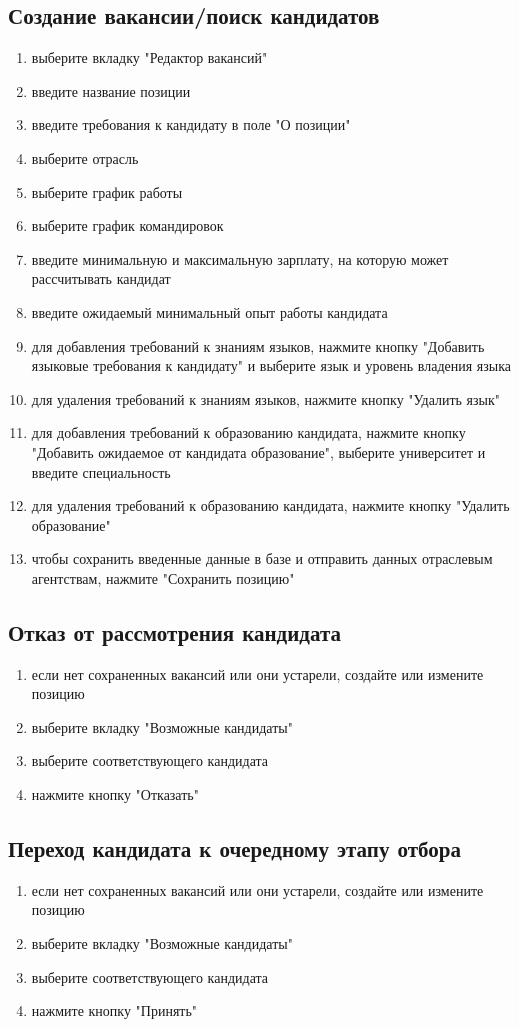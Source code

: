 \subsection{Создание вакансии/поиск кандидатов}
\begin{enumerate}
\item выберите вкладку "Редактор вакансий"
\item введите название позиции
\item введите требования к кандидату в поле "О позиции"
\item выберите отрасль
\item выберите график работы
\item выберите график командировок
\item введите минимальную и максимальную зарплату, на которую может рассчитывать кандидат
\item введите ожидаемый минимальный опыт работы кандидата
\item для добавления требований к знаниям языков, нажмите кнопку "Добавить языковые требования к кандидату" и выберите язык и уровень владения языка
\item для удаления требований к знаниям языков, нажмите кнопку "Удалить язык"
\item для добавления требований к образованию кандидата, нажмите кнопку "Добавить ожидаемое от кандидата образование", выберите университет и введите специальность
\item для удаления требований к образованию кандидата, нажмите кнопку "Удалить образование"
\item чтобы сохранить введенные данные в базе и отправить данных отраслевым агентствам, нажмите "Сохранить позицию" 
\end{enumerate}
\subsection{Отказ от рассмотрения кандидата}
\begin{enumerate}
\item если нет сохраненных вакансий или они устарели, создайте или измените позицию
\item выберите вкладку "Возможные кандидаты"
\item выберите соответствующего кандидата
\item нажмите кнопку "Отказать"
\end{enumerate}
\subsection{Переход кандидата к очередному этапу отбора}
\begin{enumerate}
\item если нет сохраненных вакансий или они устарели, создайте или измените позицию
\item выберите вкладку "Возможные кандидаты"
\item выберите соответствующего кандидата
\item нажмите кнопку "Принять"
\end{enumerate}
